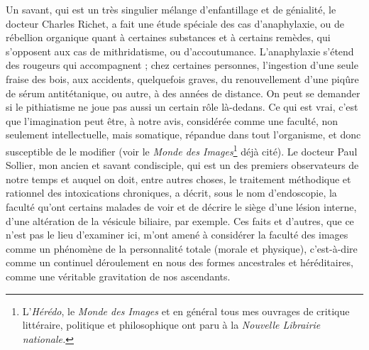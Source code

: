 \documentclass[french,twoside]{book} %
\begin{document}
Un savant, qui est un très singulier mélange d’enfantillage et de génialité, le docteur Charles Richet, a fait une étude spéciale des cas d’anaphylaxie, ou de rébellion organique quant à certaines substances et à certains remèdes, qui s’opposent aux cas de mithridatisme, ou d’accoutumance. L’anaphylaxie s’étend des rougeurs qui accompagnent ; chez certaines personnes, l’ingestion d’une seule fraise des bois, aux accidents, quelquefois graves, du renouvellement d’une piqûre de sérum antitétanique, ou autre, à des années de distance. On peut se demander si le pithiatisme ne joue pas aussi un certain rôle là-dedans. Ce qui est vrai, c’est que l’imagination peut être, à notre avis, considérée comme une faculté, non seulement intellectuelle, mais somatique, répandue dans tout l’organisme, et donc susceptible de le modifier (voir le {\itshape Monde des Images}\footnote{ L’{\itshape Hérédo}, le {\itshape Monde des Images} et en général tous mes ouvrages de critique littéraire, politique et philosophique ont paru à la {\itshape Nouvelle Librairie nationale.}} déjà cité). Le docteur Paul Sollier, mon ancien et savant condisciple, qui est un des premiers observateurs de notre temps et auquel on doit, entre autres choses, le traitement méthodique et rationnel des intoxications chroniques, a décrit, sous le nom d’endoscopie, la faculté qu’ont certains malades de voir et de décrire le siège d’une lésion interne, d’une altération de la vésicule biliaire, par exemple. Ces faits et d’autres, que ce n’est pas le lieu d’examiner ici, m’ont amené à considérer la faculté des images comme un phénomène de la personnalité totale (morale et physique), c’est-à-dire comme un continuel déroulement en nous des formes ancestrales et héréditaires, comme une véritable gravitation de nos ascendants.\par
\end{document}
